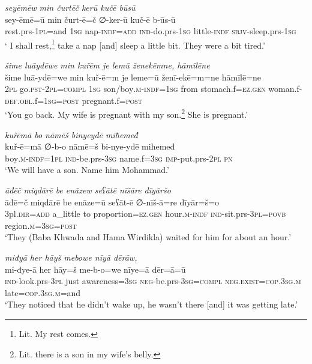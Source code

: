 \ea \label{BP.182}
\textit{seyēmēw min čurtēč kerū kučē būsū} \\ 
\gll sey-ēmē=ū min čurt-ē=č ∅-ker-ū kuč-ē b-ūs-ū \\ 
 rest.prs-\textsc{1pl}=and \textsc{1sg} nap\textsc{-indf}\textsc{=add} \textsc{ind-}do.prs\textsc{-\textsc{1sg}} little\textsc{-indf} \textsc{sbjv-}sleep.prs\textsc{-\textsc{1sg}} \\ 
\glt ` I shall rest,\footnote{Lit. My rest comes.} take a nap [and] sleep a little bit. They were a bit tired.'
\z 
 
\ea \label{BP.185}
\textit{šime luāydēwe min kuřēm je lemū ženekēmne, hāmīlēne} \\ 
\gll šime luā-ydē=we min kuř-ē=m je leme=ū ženī-ekē=m=ne hāmīlē=ne \\ 
 \textsc{2pl} go\textsc{.pst}-\textsc{2pl}\textsc{=compl} \textsc{1sg} son/boy\textsc{.m}\textsc{-indf}\textsc{=\textsc{1sg}} from stomach.f\textsc{=ez.gen} woman.f\textsc{-def}\textsc{.obl}.f\textsc{=\textsc{1sg}}\textsc{=\textsc{post}} pregnant.f\textsc{=\textsc{post}} \\ 
\glt `You go back. My wife is pregnant with my son.\footnote{Lit. there is a son in my wife’s belly.} She is pregnant.'
\z 
 
\ea \label{BP.186}
\textit{kuřēmā bo nāmēš binyeydē miħemeđ} \\ 
\gll kuř-ē=mā ∅-b-o nāmē=š bi-nye-ydē miħemeđ \\ 
 boy\textsc{.m}\textsc{-indf}\textsc{=\textsc{1pl}} \textsc{ind-}be.prs\textsc{-3sg} name.f\textsc{=3sg} \textsc{imp-}put.prs-\textsc{2pl} \textsc{pn} \\ 
\glt `We will have a son. Name him Mohammad.'
\z 
 
\ea \label{BP.189}
\textit{āđēč miqdārē be enāzew seʕātē nīšāre dīyāršo} \\ 
\gll āđē=č miqdārē be enāze=ū seʕāt-ē ∅-nīš-ā=re dīyār=š=o \\ 
 3pl\textsc{.dir}\textsc{=add} a\_little to proportion\textsc{=ez.gen} hour\textsc{.m}\textsc{-indf} \textsc{ind-}sit.prs\textsc{-3pl}\textsc{=\textsc{povb}} region\textsc{.m}\textsc{=3sg}\textsc{=\textsc{post}} \\ 
\glt `They (Baba Khwada and Hama Wirdikla) waited for him for about an hour.'
\z 
 
\ea \label{BP.190}
\textit{miđyā her hāyš mebowe nīyā dērāw,} \\ 
\gll mi-đye-ā her hāy=š me-b-o=we nīye=ā dēr=ā=ū \\ 
 \textsc{ind-}look.prs\textsc{-3pl} just awareness\textsc{=3sg} \textsc{neg-}be.prs\textsc{-3sg}\textsc{=compl} \textsc{\textsc{neg.}exist}\textsc{=cop}\textsc{.3sg}\textsc{.m} late\textsc{=cop}\textsc{.3sg}\textsc{.m}=and \\ 
\glt `They noticed that he didn’t wake up, he wasn’t there [and] it was getting late.'
\z 
 
